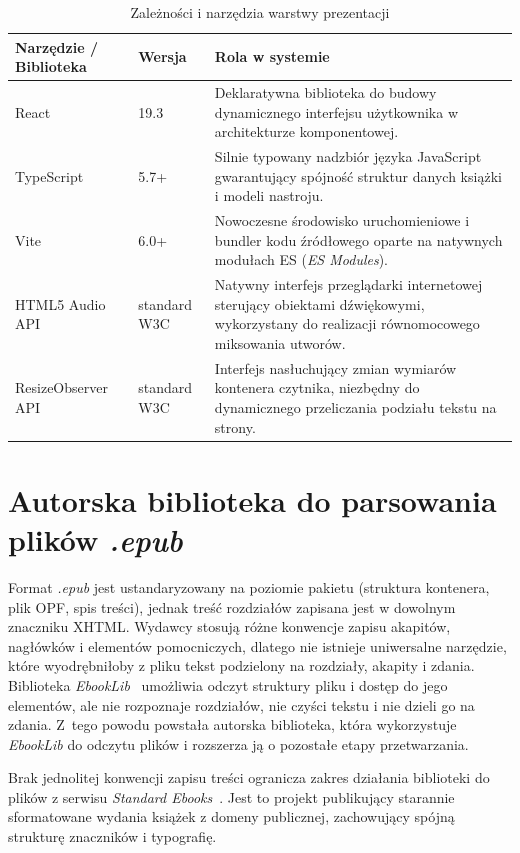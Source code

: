 \begin{table}[htbp]
    \centering
    \caption{Zależności i narzędzia warstwy prezentacji}
    \label{tab:frontend_libraries}
    \begin{tabularx}{\textwidth}{l l X}
        \toprule
        \textbf{Narzędzie / Biblioteka} & \textbf{Wersja} & \textbf{Rola w systemie} \\
        \midrule
        React & 19.3 & Deklaratywna biblioteka do budowy dynamicznego interfejsu użytkownika w architekturze komponentowej. \\
        TypeScript & 5.7+ & Silnie typowany nadzbiór języka JavaScript gwarantujący spójność struktur danych książki i modeli nastroju. \\
        Vite & 6.0+ & Nowoczesne środowisko uruchomieniowe i bundler kodu źródłowego oparte na natywnych modułach ES (\textit{ES Modules}). \\
        HTML5 Audio API & standard W3C & Natywny interfejs przeglądarki internetowej sterujący obiektami dźwiękowymi, wykorzystany do realizacji równomocowego miksowania
        utworów. \\
        ResizeObserver API & standard W3C & Interfejs nasłuchujący zmian wymiarów kontenera czytnika, niezbędny do dynamicznego przeliczania podziału tekstu na strony. \\
        \bottomrule
    \end{tabularx}
\end{table}



\section{Autorska biblioteka do parsowania plików \textit{.epub}}
Format \textit{.epub} jest ustandaryzowany na poziomie pakietu (struktura kontenera,
plik OPF, spis treści), jednak treść rozdziałów zapisana jest w dowolnym znaczniku
XHTML. Wydawcy stosują różne konwencje zapisu akapitów, nagłówków i elementów
pomocniczych, dlatego nie istnieje uniwersalne narzędzie, które wyodrębniłoby z pliku
tekst podzielony na rozdziały, akapity i zdania. Biblioteka \textit{EbookLib}~\cite{epublib}
umożliwia odczyt struktury pliku i dostęp do jego elementów, ale nie rozpoznaje
rozdziałów, nie czyści tekstu i nie dzieli go na zdania. Z~tego powodu powstała
autorska biblioteka, która wykorzystuje \textit{EbookLib} do odczytu plików i
rozszerza ją o pozostałe etapy przetwarzania.

Brak jednolitej konwencji zapisu treści ogranicza zakres działania biblioteki
do plików z serwisu \textit{Standard Ebooks}~\cite{StandardEbooks}. Jest to projekt
publikujący starannie sformatowane wydania książek z domeny publicznej, zachowujący
spójną strukturę znaczników i typografię.

